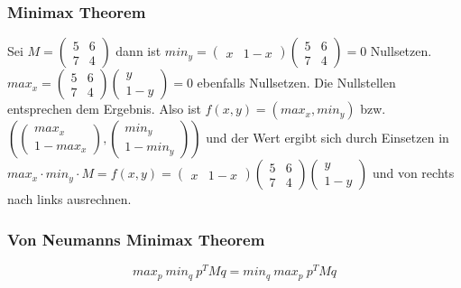 \subsubsection{Minimax Theorem}
Sei $M=\begin{pmatrix}
5 & 6 \\
7 & 4 
\end{pmatrix} $ dann ist $ min_y =  \begin{pmatrix} 
x & 1-x 
\end{pmatrix}
\begin{pmatrix}
5 & 6 \\
7 & 4 
\end{pmatrix} = 0 $ Nullsetzen.\newline $max_x = 
\begin{pmatrix}
5 & 6 \\
7 & 4 
\end{pmatrix}
\begin{pmatrix}
y \\
1-y 
\end{pmatrix} = 0 $ ebenfalls Nullsetzen.
Die Nullstellen entsprechen dem Ergebnis. \newline Also ist $f(x,y)=(max_x,min_y)$ bzw. $(\begin{pmatrix}
max_x \\
1 - max_x
\end{pmatrix}
,
\begin{pmatrix}
min_y \\
1 - min_y
\end{pmatrix} )$ und der Wert ergibt sich durch Einsetzen in $ max_x \cdot min_y \cdot M=f(x,y) = 
\begin{pmatrix} 
x & 1-x 
\end{pmatrix}
\begin{pmatrix}
5 & 6 \\
7 & 4 
\end{pmatrix}
\begin{pmatrix}
y \\
1-y 
\end{pmatrix}$ und von rechts nach links ausrechnen.

\subsubsection{Von Neumanns Minimax Theorem}
\[max_p~min_q~p^TMq = min_q~max_p~p^TMq\]

